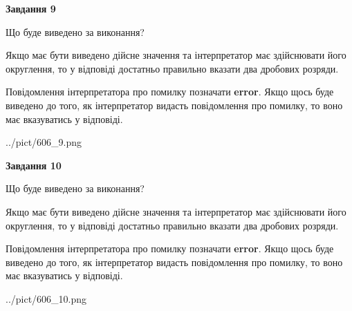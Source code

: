 \documentclass[12pt, ukrainian]{article}
\begin{document}
{\begin {Large}
{\begin {center}\textbf{Завдання 9}\end {center}}\par
Що буде виведено за виконання? \par

Якщо має бути виведено дійсне значення та інтерпретатор має здійснювати його округлення, 
то у відповіді достатньо правильно вказати два дробових розряди.

Повідомлення інтерпретатора про помилку позначати \textbf{error}.
Якщо щось буде виведено до того, як інтерпретатор видасть повідомлення про помилку, 
то воно має вказуватись у відповіді. \par

\begin{center}
	{../pict/606_9.png}
\end{center}
\newpage

{\begin {center}\textbf{Завдання 10}\end {center}}\par
Що буде виведено за виконання? \par

Якщо має бути виведено дійсне значення та інтерпретатор має здійснювати його округлення, 
то у відповіді достатньо правильно вказати два дробових розряди.

Повідомлення інтерпретатора про помилку позначати \textbf{error}.
Якщо щось буде виведено до того, як інтерпретатор видасть повідомлення про помилку, 
то воно має вказуватись у відповіді. \par

\begin{center}
	{../pict/606_10.png}
\end{center}
\newpage

\end {Large}}
\end{document}
